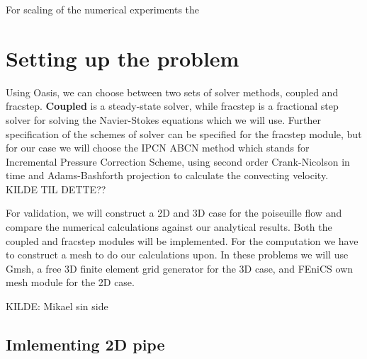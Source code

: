 \documentclass[a4paper,norsk]{article}
\begin{document}
For scaling of the numerical experiments the

\section*{Setting up the problem}
Using Oasis, we can choose between two sets of solver methods, coupled and fracstep. \textbf{Coupled} is a steady-state
solver, while fracstep is a fractional step solver for solving the Navier-Stokes equations which we will use.
Further specification of the schemes of solver can be specified for the fracstep module,
but for our case we will choose the IPCN ABCN method which stands for
Incremental Pressure Correction Scheme, using second order Crank-Nicolson in time and Adams-Bashforth
projection to calculate the convecting velocity. KILDE TIL DETTE??

For validation, we will construct a 2D and 3D case for the poiseuille flow and compare the
numerical calculations against our analytical results. Both the coupled and fracstep modules will be implemented.
For the computation we have to construct a mesh to do our calculations upon. In these problems we will use
Gmsh, a free 3D finite element grid generator for the 3D case, and FEniCS own mesh module for the 2D case.

KILDE: Mikael sin side

\subsection*{Imlementing 2D pipe}
\end{document}
